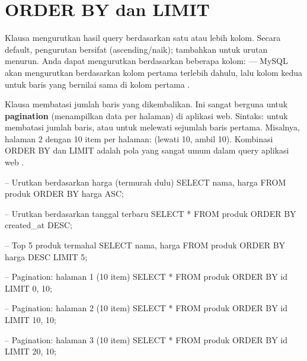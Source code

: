 \section{ORDER BY dan LIMIT}

Klausa  mengurutkan hasil query berdasarkan satu atau lebih kolom. Secara default, pengurutan bersifat  (ascending/naik); tambahkan  untuk urutan menurun. Anda dapat mengurutkan berdasarkan beberapa kolom:  --- MySQL akan mengurutkan berdasarkan kolom pertama terlebih dahulu, lalu kolom kedua untuk baris yang bernilai sama di kolom pertama \cite{mysqlDocs}.

Klausa  membatasi jumlah baris yang dikembalikan. Ini sangat berguna untuk \textbf{pagination} (menampilkan data per halaman) di aplikasi web. Sintaks:  untuk membatasi jumlah baris, atau  untuk melewati sejumlah baris pertama. Misalnya, halaman 2 dengan 10 item per halaman:  (lewati 10, ambil 10). Kombinasi ORDER BY dan LIMIT adalah pola yang sangat umum dalam query aplikasi web \cite{mysqlGettingStarted}.

\begin{webcode}[language=SQL, caption={ORDER BY dan LIMIT untuk pengurutan dan pagination}]
-- Urutkan berdasarkan harga (termurah dulu)
SELECT nama, harga FROM produk ORDER BY harga ASC;

-- Urutkan berdasarkan tanggal terbaru
SELECT * FROM produk ORDER BY created_at DESC;

-- Top 5 produk termahal
SELECT nama, harga FROM produk ORDER BY harga DESC LIMIT 5;

-- Pagination: halaman 1 (10 item)
SELECT * FROM produk ORDER BY id LIMIT 0, 10;

-- Pagination: halaman 2 (10 item)
SELECT * FROM produk ORDER BY id LIMIT 10, 10;

-- Pagination: halaman 3 (10 item)
SELECT * FROM produk ORDER BY id LIMIT 20, 10;
\end{webcode}

